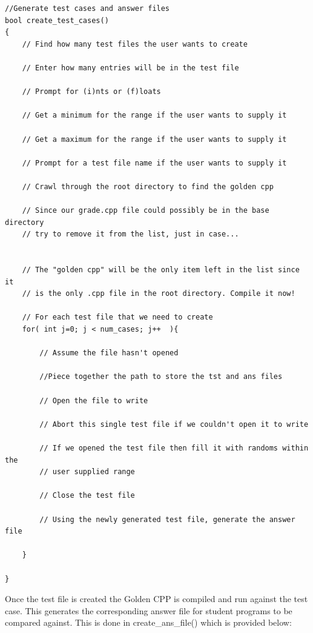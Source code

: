 \begin{lstlisting}
//Generate test cases and answer files 
bool create_test_cases()
{
    // Find how many test files the user wants to create

    // Enter how many entries will be in the test file
    
    // Prompt for (i)nts or (f)loats

    // Get a minimum for the range if the user wants to supply it

    // Get a maximum for the range if the user wants to supply it

    // Prompt for a test file name if the user wants to supply it

    // Crawl through the root directory to find the golden cpp
    
    // Since our grade.cpp file could possibly be in the base directory
    // try to remove it from the list, just in case...

    
    // The "golden cpp" will be the only item left in the list since it 
    // is the only .cpp file in the root directory. Compile it now!

    // For each test file that we need to create
    for( int j=0; j < num_cases; j++  ){
        
        // Assume the file hasn't opened

        //Piece together the path to store the tst and ans files
        
        // Open the file to write

        // Abort this single test file if we couldn't open it to write
 
        // If we opened the test file then fill it with randoms within the
        // user supplied range
       
        // Close the test file

        // Using the newly generated test file, generate the answer file
        
    }

}
\end{lstlisting}

Once the test file is created the Golden CPP is compiled and run against the test case. This generates the corresponding answer file for student programs to be compared against. This is done in create\_ans\_file() which is provided below:

